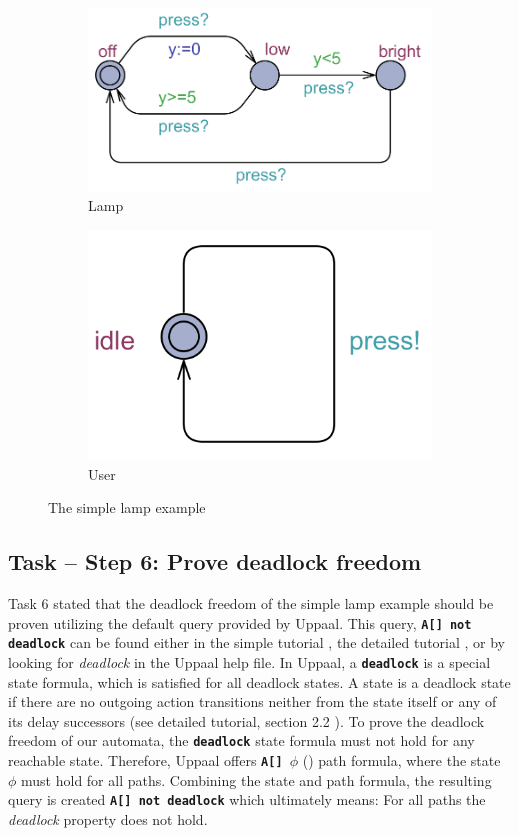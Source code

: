\documentclass{article}
\newcommand{\code}[1]{\texttt{\textbf{#1}}}
\begin{document}
\begin{figure}[h!]
	\centering
	\begin{subfigure}{.5\textwidth}
		\centering
		\includegraphics[width=.9\linewidth]{Lamp/figTLamp}
		\caption{Lamp}
	\end{subfigure}
	\begin{subfigure}{.3\textwidth}
		\centering
		\includegraphics[width=.9\linewidth]{Lamp/figTUser}
		\caption{User}
	\end{subfigure}
	\caption{The simple lamp example}
	\label{fig:SimpleLamp}
\end{figure}

\subsection{Task -- Step 6: Prove deadlock freedom}

Task 6 stated that the deadlock freedom of the simple lamp example should be proven utilizing the default query provided by Uppaal. This query, \code{A[] not deadlock} can be found either in the simple tutorial \cite{Tut02}, the detailed tutorial \cite{Tut01}, or by looking for \textit{deadlock} in the Uppaal help file. In Uppaal, a \code{deadlock} is a special state formula, which is satisfied for all deadlock states. A state is a deadlock state if
there are no outgoing action transitions neither from the state itself or any of
its delay successors (see detailed tutorial, section 2.2 \cite{Tut01}). To prove the deadlock freedom of our automata, the \code{deadlock} state formula must not hold for any reachable state. Therefore, Uppaal offers \code{A[] $\phi$} (\cite{Tut01}) path formula, where the state $\phi$ must hold for all paths. Combining the state and path formula, the resulting query is created \code{A[] not deadlock} which ultimately means: For all paths the \textit{deadlock} property does not hold.
\end{document}
